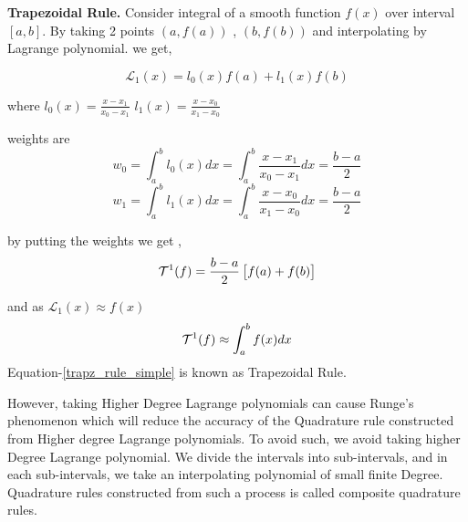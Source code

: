 \documentclass[../document.tex]{subfiles}
\begin{document}
	
	\begin{simp_num}{\normalfont\textbf{Trapezoidal Rule.}}
		Consider integral of a smooth function $f(x)$ over interval $[a,b]$.
		By taking 2 points $(a,f(a))$ , $(b,f(b))$ and interpolating by Lagrange polynomial. we get,
		
		$$
		\mathcal{L}_1(x) = l_0(x)f(a)  +  l_1(x)f(b)
		$$
		\begin{center}
			where
			$l_0(x) = \frac{x - x_1}{x_0 - x_1} $    \hspace{1cm}
			$l_1(x) = \frac{x - x_0}{x_1 - x_0} $
		\end{center}
		weights are
		$$
		w_0 = \int_a^b l_0(x) dx 
		= \int_a^b  \frac{x - x_1}{x_0 - x_1} dx
		= \frac{b-a}{2}
		$$
		$$
		w_1 = \int_a^b l_1(x) dx 
		= \int_a^b  \frac{x - x_0}{x_1 - x_0} dx
		= \frac{b-a}{2}
		$$	
		
		by putting the weights we get ,
		\begin{equation}   \label{trapz_rule_simple}
			\mathcal{T}^1(f) =\frac{b-a}{2}\left[ f(a)+f(b) \right]
		\end{equation}
		
		and as $\mathcal{L}_1(x) \approx f(x)$
		$$
		\mathcal{T}^1(f) \approx \int_a^b f(x)dx
		$$
		Equation-\eqref{trapz_rule_simple} is known as Trapezoidal Rule.
	\end{simp_num}
	
	However, taking Higher Degree Lagrange polynomials can cause Runge's phenomenon \cite{atkinson2008introduction} which will reduce the accuracy of the Quadrature rule constructed from Higher degree Lagrange polynomials. To avoid such, we avoid taking higher Degree Lagrange polynomial. We divide the intervals into sub-intervals, and in each sub-intervals, we take an interpolating polynomial of small finite Degree. Quadrature rules constructed from such a process is called composite quadrature rules.
	
\end{document}
